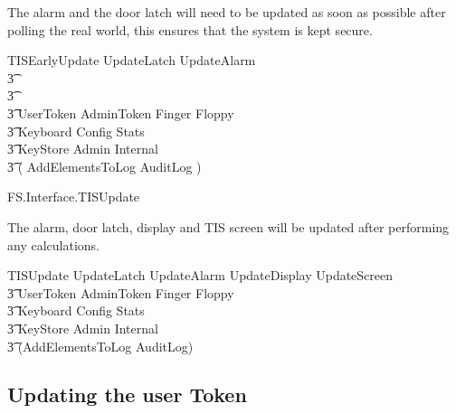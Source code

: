 The alarm and the door latch will need to be updated as soon as
possible after polling the real world, this ensures that the system is
kept secure.

\begin{zed}
        TISEarlyUpdate  UpdateLatch \land UpdateAlarm 
\\ \t3        \land [~ RealWorldChanges | screen' = screen \land
        display' = display ~]
\\ \t3   \land [\Delta IDStation | currentDisplay = currentDisplay' ]
\\ \t3 \land \Xi UserToken \land \Xi AdminToken \land \Xi Finger \land
\Xi Floppy \land 
\\ \t3  \Xi Keyboard \land \Xi Config \land
\Xi Stats  
\\ \t3 \land \Xi KeyStore \land \Xi Admin \land \Xi Internal
\\ \t3 \land ( AddElementsToLog \lor \Xi AuditLog ) 
\end{zed}

\begin{traceunit}{FS.Interface.TISUpdate}
\end{traceunit}



The alarm, door latch, display and TIS screen will be updated after performing any
calculations. 

\begin{zed}
        TISUpdate  UpdateLatch \land UpdateAlarm \land UpdateDisplay \land UpdateScreen
\\ \t3 \land \Xi UserToken \land \Xi AdminToken \land \Xi Finger \land
\Xi Floppy \land 
\\ \t3  \Xi Keyboard \land \Xi Config \land
\Xi Stats  
\\ \t3 \land \Xi KeyStore \land \Xi Admin \land \Xi Internal
\\ \t3 \land (AddElementsToLog \lor \Xi AuditLog) 
\end{zed}

\subsection{Updating the user Token}

